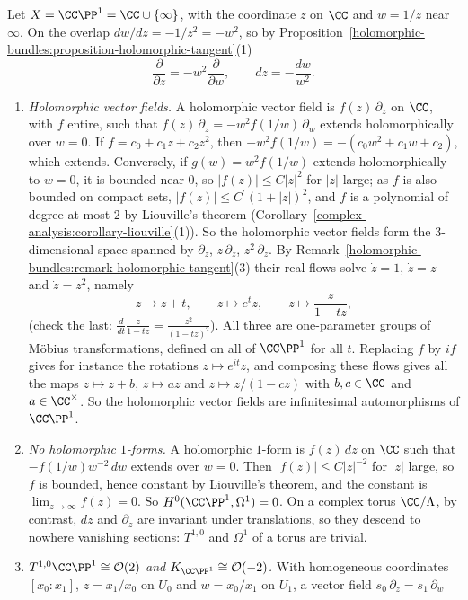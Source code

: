 \begin{example}\label{holomorphic-bundles:example-tangent-p1}
Let $X = \CC\PP^1 = \CC \cup \{\infty\}$, with the coordinate $z$ on $\CC$ and $w = 1/z$ near $\infty$. On the overlap $dw/dz = -1/z^2 = -w^2$, so by Proposition~\ref{holomorphic-bundles:proposition-holomorphic-tangent}(1)
\[
\frac{\partial}{\partial z} = -w^2\frac{\partial}{\partial w}, \qquad dz = -\frac{dw}{w^2}.
\]
\begin{enumerate}
\item \emph{Holomorphic vector fields.} A holomorphic vector field is $f(z)\,\partial_z$ on $\CC$, with $f$ entire, such that $f(z)\,\partial_z = -w^2f(1/w)\,\partial_w$ extends holomorphically over $w = 0$. If
$f = c_0 + c_1z + c_2z^2$, then $-w^2f(1/w) = -(c_0w^2 + c_1w + c_2)$, which extends. Conversely, if $g(w) = w^2f(1/w)$ extends holomorphically to $w = 0$, it is bounded near $0$, so $|f(z)| \leq C|z|^2$ for $|z|$
large; as $f$ is also bounded on compact sets, $|f(z)| \leq C^{\prime}(1 + |z|)^2$, and $f$ is a polynomial of degree at most $2$ by Liouville's theorem (Corollary~\ref{complex-analysis:corollary-liouville}(1)). So the
holomorphic vector fields form the $3$-dimensional space spanned by $\partial_z$, $z\,\partial_z$, $z^2\,\partial_z$. By Remark~\ref{holomorphic-bundles:remark-holomorphic-tangent}(3) their real flows solve
$\dot z = 1$, $\dot z = z$ and $\dot z = z^2$, namely
\[
z \mapsto z + t, \qquad z \mapsto e^tz, \qquad z \mapsto \frac{z}{1 - tz},
\]
(check the last: $\frac{d}{dt}\frac{z}{1 - tz} = \frac{z^2}{(1 - tz)^2}$). All three are one-parameter groups of M\"obius transformations, defined on all of $\CC\PP^1$ for all $t$. Replacing $f$ by $if$ gives for instance the rotations
$z \mapsto e^{it}z$, and composing these flows gives all the maps $z \mapsto z + b$, $z \mapsto az$ and $z \mapsto z/(1 - cz)$ with $b, c \in \CC$ and $a \in \CC^\times$. So the holomorphic vector fields are
infinitesimal automorphisms of $\CC\PP^1$.
\item \emph{No holomorphic $1$-forms.} A holomorphic $1$-form is $f(z)\,dz$ on $\CC$ such that $-f(1/w)w^{-2}\,dw$ extends over $w = 0$. Then $|f(z)| \leq C|z|^{-2}$ for $|z|$ large, so $f$ is bounded, hence constant
by Liouville's theorem, and the constant is $\lim_{z \to \infty}f(z) = 0$. So $H^0(\CC\PP^1, \Omega^1) = 0$. On a complex torus $\CC/\Lambda$, by contrast, $dz$ and $\partial_z$ are invariant under translations, so they
descend to nowhere vanishing sections: $T^{1,0}$ and $\Omega^1$ of a torus are trivial.
\item \emph{$T^{1,0}\CC\PP^1 \cong \mathcal{O}(2)$ and $K_{\CC\PP^1} \cong \mathcal{O}(-2)$.} With homogeneous coordinates $[x_0 : x_1]$, $z = x_1/x_0$ on $U_0$ and $w = x_0/x_1$ on $U_1$, a vector field $s_0\,\partial_z = s_1\,\partial_w$

\end{enumerate}
\end{example}
